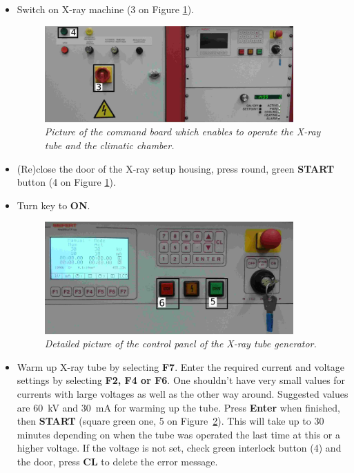 \documentclass[a4paper,12pt,twoside]{article}
\begin{document}
\begin{itemize}
\item {Switch on X-ray machine (3 on Figure \ref{Commandboard}).
\begin{figure} [h!] \centering 
\includegraphics[width=0.9\textwidth, angle=0] {./Full2.jpg}
\caption{\em  \label{Commandboard}
Picture of the command board which enables to operate the X-ray tube and the climatic chamber.}
\end{figure}
}
\item {(Re)close the door of the X-ray setup housing, press round, green \textbf{START} button (4 on Figure \ref{Commandboard}).}
\item {Turn key to \textbf{ON}.
\begin{figure} [h!] \centering 
\includegraphics[width=0.9\textwidth, angle=0] {./CommandBoard2.jpg}
\caption{\em  \label{Xray}
Detailed picture of the control panel of the X-ray tube generator.}
\end{figure}
}
\item{Warm up X-ray tube by selecting \textbf{F7}. Enter the required current and voltage settings by selecting \textbf{F2, F4 or F6}. One shouldn't have very small values for currents with large voltages as well as the other way around. Suggested values are \SI{60}{\kV} and \SI{30}{\mA} for warming up the tube. Press \textbf{Enter} when finished, then \textbf{START} (square green one, 5 on Figure~\ref{Xray}). This will take up to 30 minutes depending on when the tube was operated the last time at this or a higher voltage. If the voltage is not set, check green interlock button (4) and the door, press \textbf{CL} to delete the error message.}

\end{itemize}
\end{document}
